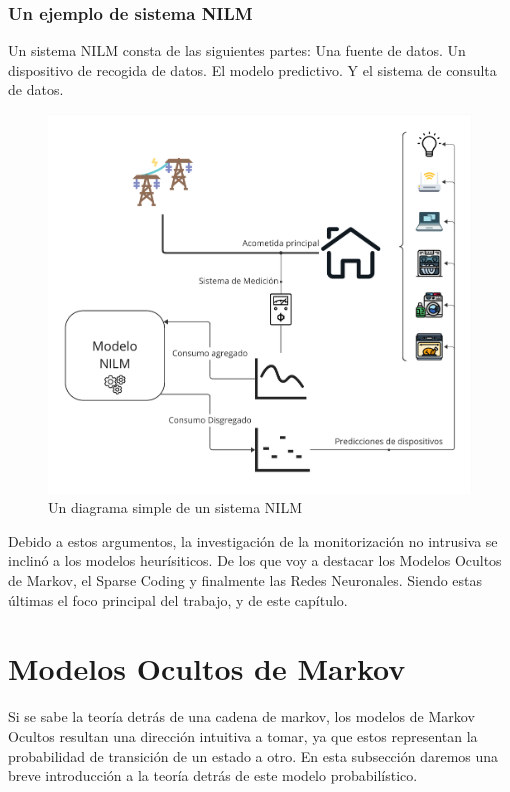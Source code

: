 \subsubsection{Un ejemplo de sistema NILM}
Un sistema NILM consta de las siguientes partes: Una fuente de datos. Un dispositivo de recogida de datos. El modelo predictivo. Y el sistema de consulta de datos.
\begin{figure}
    \centering
    \includegraphics[width=450px]{images/SistemaNILM.pdf}
    \caption{Un diagrama simple de un sistema NILM}
    \label{diagramaNILM}
\end{figure}

Debido a estos argumentos, la investigación de la monitorización no intrusiva se inclinó a los modelos heurísiticos. De los que voy a destacar los Modelos Ocultos de Markov, el Sparse Coding y finalmente las Redes Neuronales. Siendo estas últimas el foco principal del trabajo, y de este capítulo. 

\section{Modelos Ocultos de Markov}
Si se sabe la teoría detrás de una cadena de markov, los modelos de Markov Ocultos resultan una dirección intuitiva a tomar, ya que estos representan la probabilidad de transición de un estado a otro. En esta subsección daremos una breve introducción a la teoría detrás de este modelo probabilístico.
